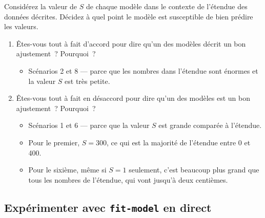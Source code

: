 \documentclass[12pt,a4paper]{article}
\begin{document}
\begin{activitybox}
  Considérez la valeur de $S$ de chaque modèle dans le contexte de l'étendue des données décrites. Décidez à quel point le modèle est susceptible de bien prédire les valeurs.

  \begin{enumerate}[leftmargin=*]
    \item Êtes-vous tout à fait d'accord pour dire qu'un des modèles décrit un bon ajustement~? Pourquoi~?
    \begin{itemize}
      \item Scénarios 2 et 8 — parce que les nombres dans l'étendue sont énormes et la valeur $S$ est très petite.
    \end{itemize}
    \item Êtes-vous tout à fait en désaccord pour dire qu'un des modèles est un bon ajustement~? Pourquoi~?
    \begin{itemize}
      \item Scénarios 1 et 6 — parce que la valeur $S$ est grande comparée à l'étendue.
      \item Pour le premier, $S = 300$, ce qui est la majorité de l'étendue entre 0 et 400.
      \item Pour le sixième, même si $S = 1$ seulement, c'est beaucoup plus grand que tous les nombres de l'étendue, qui vont jusqu'à deux centièmes.
    \end{itemize}
  \end{enumerate}
\end{activitybox}

\subsection{Expérimenter avec \texttt{fit-model} en direct}
\end{document}
